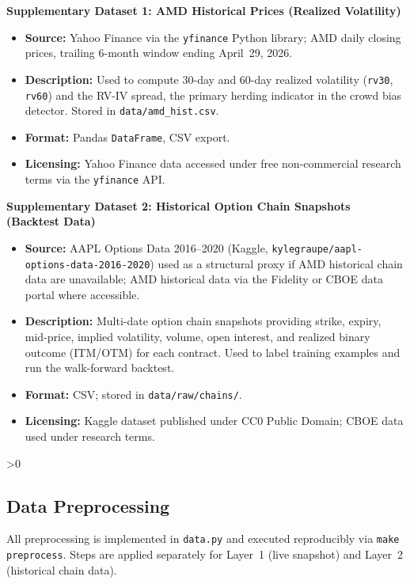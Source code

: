 \documentclass[12pt, letterpaper]{article}
\let\oldsubsection\subsection
\renewcommand{\subsection}{%
  \ifnum\value{subsection}>0 \clearpage\fi
  \oldsubsection
}
\begin{document}
\newpage
\noindent\textbf{Supplementary Dataset 1: AMD Historical Prices
(Realized Volatility)}
\begin{itemize}
  \item \textbf{Source:} Yahoo Finance via the \texttt{yfinance}
        Python library; AMD daily closing prices, trailing 6-month
        window ending April~29, 2026.
  \item \textbf{Description:} Used to compute 30-day and 60-day
        realized volatility (\texttt{rv30}, \texttt{rv60}) and the
        RV-IV spread, the primary herding indicator in the crowd
        bias detector. Stored in \texttt{data/amd\_hist.csv}.
  \item \textbf{Format:} Pandas \texttt{DataFrame}, CSV export.
  \item \textbf{Licensing:} Yahoo Finance data accessed under free
        non-commercial research terms via the \texttt{yfinance} API.
\end{itemize}

\medskip
\noindent\textbf{Supplementary Dataset 2: Historical Option Chain
Snapshots (Backtest Data)}
\begin{itemize}
  \item \textbf{Source:} AAPL Options Data 2016--2020 (Kaggle,
        \texttt{kylegraupe/aapl-options-data-2016-2020}) used as a
        structural proxy if AMD historical chain data are
        unavailable; AMD historical data via the Fidelity or CBOE
        data portal where accessible.
  \item \textbf{Description:} Multi-date option chain snapshots
        providing strike, expiry, mid-price, implied volatility,
        volume, open interest, and realized binary outcome (ITM/OTM)
        for each contract. Used to label training examples and run
        the walk-forward backtest.
  \item \textbf{Format:} CSV; stored in \texttt{data/raw/chains/}.
  \item \textbf{Licensing:} Kaggle dataset published under CC0
        Public Domain; CBOE data used under research terms.
\end{itemize}

\subsection{Data Preprocessing}

\enlargethispage{\baselineskip}
All preprocessing is implemented in \texttt{data.py} and executed
reproducibly via \texttt{make preprocess}. Steps are applied
separately for Layer~1 (live snapshot) and Layer~2 (historical
chain data).
\end{document}
